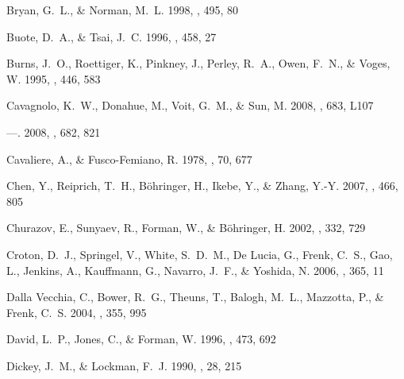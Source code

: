 \documentclass[12pt,preprint]{aastex}
\begin{document}
\begin{thebibliography}{137}
{Bryan}, G.~L., \& {Norman}, M.~L. 1998, \apj, 495, 80

{Buote}, D.~A., \& {Tsai}, J.~C. 1996, \apj, 458, 27

{Burns}, J.~O., {Roettiger}, K., {Pinkney}, J., {Perley}, R.~A., {Owen}, F.~N.,
  \& {Voges}, W. 1995, \apj, 446, 583

{Cavagnolo}, K.~W., {Donahue}, M., {Voit}, G.~M., \& {Sun}, M.
  2008{}, \apjl, 683, L107

---. 2008{}, \apj, 682, 821

{Cavaliere}, A., \& {Fusco-Femiano}, R. 1978, \aap, 70, 677

{Chen}, Y., {Reiprich}, T.~H., {B{\"o}hringer}, H., {Ikebe}, Y., \& {Zhang},
  Y.-Y. 2007, \aap, 466, 805

{Churazov}, E., {Sunyaev}, R., {Forman}, W., \& {B{\"o}hringer}, H. 2002,
  \mnras, 332, 729

{Croton}, D.~J., {Springel}, V., {White}, S.~D.~M., {De Lucia}, G., {Frenk},
  C.~S., {Gao}, L., {Jenkins}, A., {Kauffmann}, G., {Navarro}, J.~F., \&
  {Yoshida}, N. 2006, \mnras, 365, 11

{Dalla Vecchia}, C., {Bower}, R.~G., {Theuns}, T., {Balogh}, M.~L., {Mazzotta},
  P., \& {Frenk}, C.~S. 2004, \mnras, 355, 995

{David}, L.~P., {Jones}, C., \& {Forman}, W. 1996, \apj, 473, 692

{Dickey}, J.~M., \& {Lockman}, F.~J. 1990, \araa, 28, 215


\end{thebibliography}
\end{document}
